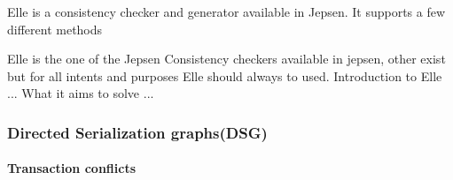 \documentclass[a4paper,10pt,titlepage]{report}
\begin{document}
    
    Elle is a consistency checker and generator available in Jepsen. It supports a few different methods 
    
    Elle is the one of the Jepsen Consistency checkers available in jepsen, other exist but for all intents and purposes Elle should always to used. 
    Introduction to Elle
    ...
    What it aims to solve
    ...
    \subsubsection{Directed Serialization graphs(DSG)}
    
    
    \paragraph{Transaction conflicts}
    
\end{document}
